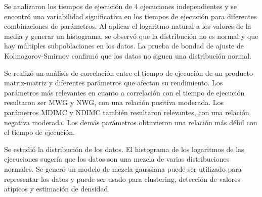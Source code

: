 Se analizaron los tiempos de ejecución de 4 ejecuciones independientes y se encontró una variabilidad significativa en los tiempos de ejecución para diferentes combinaciones de parámetros. Al aplicar el logaritmo natural a los valores de la media y generar un histograma, se observó que la distribución no es normal y que hay múltiples subpoblaciones en los datos. La prueba de bondad de ajuste de Kolmogorov-Smirnov confirmó que los datos no siguen una distribución normal.

Se realizó un análisis de correlación entre el tiempo de ejecución de un producto matriz-matriz y diferentes parámetros que afectan su rendimiento. Los parámetros más relevantes en cuanto a correlación con el tiempo de ejecución resultaron ser MWG y NWG, con una relación positiva moderada. Los parámetros MDIMC y NDIMC también resultaron relevantes, con una relación negativa moderada. Los demás parámetros obtuvieron una relación más débil con el tiempo de ejecución.

Se estudió la distribución de los datos. El histograma de los logaritmos de las ejecuciones sugería que los datos son una mezcla de varias distribuciones normales. Se generó un modelo de mezcla gaussiana puede ser utilizado para representar los datos y puede ser usado para clustering, detección de valores atípicos y estimación de densidad.